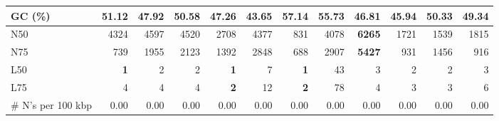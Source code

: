 \documentclass[12pt,a4paper]{article}
\begin{document}
\begin{table}[ht]
\begin{center}
\begin{tabular}{|l*{11}{|r}|}
GC (\%) & 51.12 & 47.92 & 50.58 & 47.26 & 43.65 & 57.14 & 55.73 & 46.81 & 45.94 & 50.33 & 49.34 \\ \hline
N50 & 4324 & 4597 & 4520 & 2708 & 4377 & 831 & 4078 & {\bf 6265} & 1721 & 1539 & 1815 \\ \hline
N75 & 739 & 1955 & 2123 & 1392 & 2848 & 688 & 2907 & {\bf 5427} & 931 & 1456 & 916 \\ \hline
L50 & {\bf 1} & 2 & 2 & {\bf 1} & 7 & {\bf 1} & 43 & 3 & 2 & 2 & 3 \\ \hline
L75 & 4 & 4 & 4 & {\bf 2} & 12 & {\bf 2} & 78 & 4 & 3 & 3 & 6 \\ \hline
\# N's per 100 kbp & 0.00 & 0.00 & 0.00 & 0.00 & 0.00 & 0.00 & 0.00 & 0.00 & 0.00 & 0.00 & 0.00 \\ \hline
\end{tabular}
\end{center}
\end{table}
\end{document}
